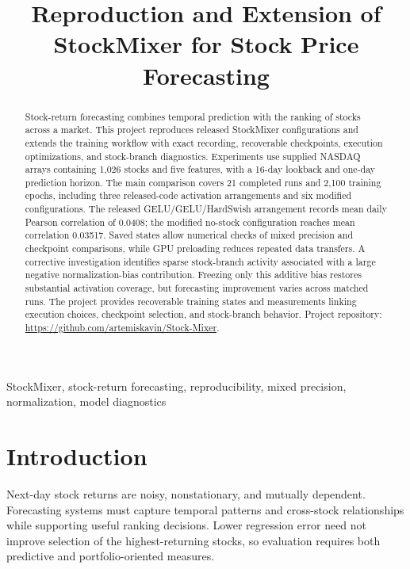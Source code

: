 \documentclass[conference]{IEEEtran}
\begin{document}
\title{Reproduction and Extension of StockMixer for Stock Price Forecasting}
\author{
}
\maketitle
\begin{abstract}
Stock-return forecasting combines temporal prediction with the ranking of stocks across a market. This project reproduces released StockMixer configurations and extends the training workflow with exact recording, recoverable checkpoints, execution optimizations, and stock-branch diagnostics. Experiments use supplied NASDAQ arrays containing 1,026 stocks and five features, with a 16-day lookback and one-day prediction horizon. The main comparison covers 21 completed runs and 2,100 training epochs, including three released-code activation arrangements and six modified configurations. The released GELU/GELU/HardSwish arrangement records mean daily Pearson correlation of 0.0408; the modified no-stock configuration reaches mean correlation 0.03517. Saved states allow numerical checks of mixed precision and checkpoint comparisons, while GPU preloading reduces repeated data transfers. A corrective investigation identifies sparse stock-branch activity associated with a large negative normalization-bias contribution. Freezing only this additive bias restores substantial activation coverage, but forecasting improvement varies across matched runs. The project provides recoverable training states and measurements linking execution choices, checkpoint selection, and stock-branch behavior. Project repository: \url{https://github.com/artemiskavin/Stock-Mixer}.
\end{abstract}
\begin{IEEEkeywords}
StockMixer, stock-return forecasting, reproducibility, mixed precision, normalization, model diagnostics
\end{IEEEkeywords}
\section{Introduction}
Next-day stock returns are noisy, nonstationary, and mutually dependent. Forecasting systems must capture temporal patterns and cross-stock relationships while supporting useful ranking decisions. Lower regression error need not improve selection of the highest-returning stocks, so evaluation requires both predictive and portfolio-oriented measures.
\end{document}

